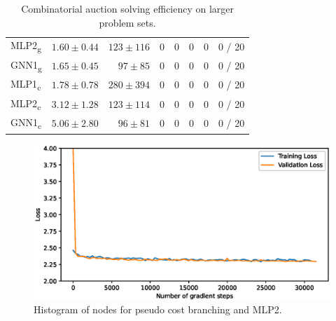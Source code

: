 \begin{scriptsize}
\begin{table}[ht]
\begin{tabular}{lrrrrrrr}
		MLP2\textsubscript{g} & $1.60 \pm 0.44$ & $123 \pm 116$ & 0 & 0 & 0 & 0 & 0 / 20\\
		GNN1\textsubscript{g} & $1.65 \pm 0.45$ & $97 \pm 85$ & 0 & 0 & 0 & 0 & 0 / 20\\
		\addlinespace
		MLP1\textsubscript{c} & $1.78 \pm 0.78$ & $280 \pm 394$ & 0 & 0 & 0 & 0 & 0 / 20\\
		MLP2\textsubscript{c} & $3.12 \pm 1.28$ & $123 \pm 114$ & 0 & 0 & 0 & 0 & 0 / 20\\
		GNN1\textsubscript{c} & $5.06 \pm 2.80$ & $96 \pm 81$ & 0 & 0 & 0 & 0 & 0 / 20\\
		\bottomrule
	\end{tabular}
	\caption{Combinatorial auction solving efficiency on larger problem sets.}\label{tab:results_trans_cauction}
\end{table}
\end{scriptsize}


\begin{figure}[h]
    \centering
    \includegraphics[width=\textwidth]{img/loss70.eps}
    \caption{Histogram of nodes for pseudo cost branching and MLP2.}
    \label{fig:node_histogram}
\end{figure}

